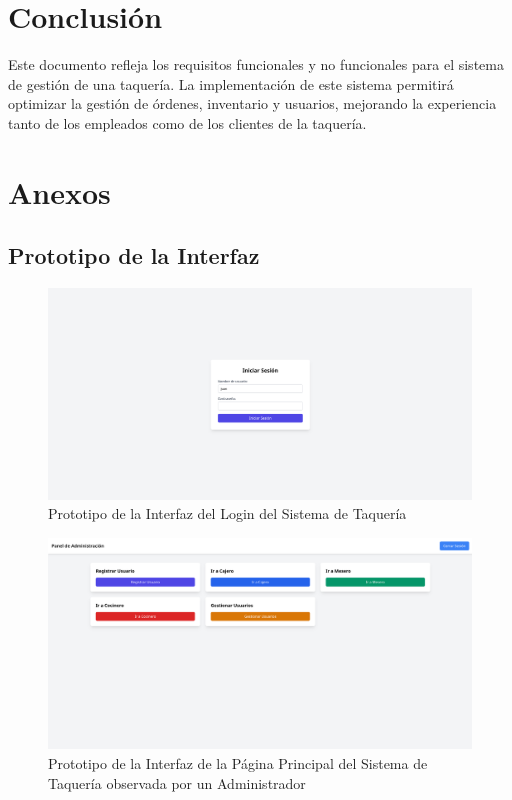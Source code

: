 \documentclass{article}
\begin{document}
\newpage
\section{Conclusión}
Este documento refleja los requisitos funcionales y no funcionales para el sistema de gestión de una taquería. La implementación de este sistema permitirá optimizar la gestión de órdenes, inventario y usuarios, mejorando la experiencia tanto de los empleados como de los clientes de la taquería.

\section{Anexos}
\subsection{Prototipo de la Interfaz}
\begin{figure}[H]
    \centering
    \includegraphics[width=1\textwidth]{img/login.png}
    \caption{Prototipo de la Interfaz del Login del Sistema de Taquería}
    \label{fig:prototipo_interfaz}
\end{figure}

\begin{figure}[H]
    \centering
    \includegraphics[width=1\textwidth]{img/principal.png}
    \caption{Prototipo de la Interfaz de la Página Principal del Sistema de Taquería observada por un Administrador}
    \label{fig:prototipo_interfaz_ordenes}
\end{figure}
\end{document}
